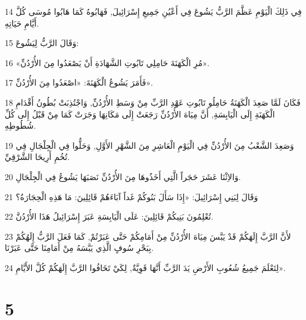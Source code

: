 \par 14 فِي ذَلِكَ الْيَوْمِ عَظَّمَ الرَّبُّ يَشُوعَ فِي أَعْيُنِ جَمِيعِ إِسْرَائِيلَ, فَهَابُوهُ كَمَا هَابُوا مُوسَى كُلَّ أَيَّامِ حَيَاتِهِ.
\par 15 وَقَالَ الرَّبُّ لِيَشُوعَ:
\par 16 «مُرِ الْكَهَنَةَ حَامِلِي تَابُوتِ الشَّهَادَةِ أَنْ يَصْعَدُوا مِنَ الأُرْدُنِّ».
\par 17 فَأَمَرَ يَشُوعُ الْكَهَنَةَ: «اصْعَدُوا مِنَ الأُرْدُنِّ».
\par 18 فَكَانَ لَمَّا صَعِدَ الْكَهَنَةُ حَامِلُو تَابُوتِ عَهْدِ الرَّبِّ مِنْ وَسَطِ الأُرْدُنِّ, وَاجْتُذِبَتْ بُطُونُ أَقْدَامِ الْكَهَنَةِ إِلَى الْيَابِسَةِ, أَنَّ مِيَاهَ الأُرْدُنِّ رَجَعَتْ إِلَى مَكَانِهَا وَجَرَتْ كَمَا مِنْ قَبْلُ إِلَى كُلِّ شُطُوطِهِ.
\par 19 وَصَعِدَ الشَّعْبُ مِنَ الأُرْدُنِّ فِي الْيَوْمِ الْعَاشِرِ مِنَ الشَّهْرِ الأَوَّلِ, وَحَلُّوا فِي الْجِلْجَالِ فِي تُخُمِ أَرِيحَا الشَّرْقِيِّ.
\par 20 وَالاِثْنَا عَشَرَ حَجَراً الَّتِي أَخَذُوهَا مِنَ الأُرْدُنِّ نَصَبَهَا يَشُوعُ فِي الْجِلْجَالِ.
\par 21 وَقَالَ لِبَنِي إِسْرَائِيلَ: «إِذَا سَأَلَ بَنُوكُمْ غَداً آبَاءَهُمْ قَائِلِينَ: مَا هَذِهِ الْحِجَارَةُ؟
\par 22 تُعْلِمُونَ بَنِيكُمْ قَائِلِينَ: عَلَى الْيَابِسَةِ عَبَرَ إِسْرَائِيلُ هَذَا الأُرْدُنَّ.
\par 23 لأَنَّ الرَّبَّ إِلَهَكُمْ قَدْ يَبَّسَ مِيَاهَ الأُرْدُنِّ مِنْ أَمَامِكُمْ حَتَّى عَبَرْتُمْ, كَمَا فَعَلَ الرَّبُّ إِلَهُكُمْ بِبَحْرِ سُوفٍ الَّذِي يَبَّسَهُ مِنْ أَمَامِنَا حَتَّى عَبَرْنَا.
\par 24 لِتَعْلَمَ جَمِيعُ شُعُوبِ الأَرْضِ يَدَ الرَّبِّ أَنَّهَا قَوِيَّةٌ, لِكَيْ تَخَافُوا الرَّبَّ إِلَهَكُمْ كُلَّ الأَيَّامِ».

\chapter{5}

